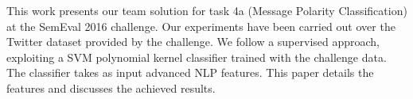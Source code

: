 This work presents our team solution for task 4a  (Message Polarity Classification) at the SemEval 2016 challenge. Our experiments have been carried out over the Twitter dataset provided by the challenge. We follow a supervised approach, exploiting a SVM polynomial kernel classifier trained with the challenge data.  The classifier takes as input advanced NLP features. This paper details the features and discusses the achieved results.
